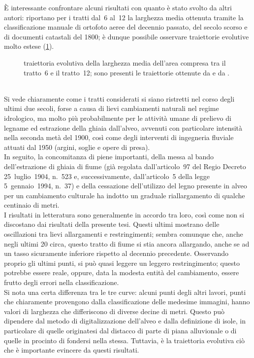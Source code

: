 È interessante confrontare alcuni risultati con quanto è stato svolto da altri autori:  riportano per i tratti dal~6 al~12 la larghezza media ottenuta tramite la classificazione manuale di ortofoto aeree del decennio passato, del secolo scorso e di documenti catastali del 1800; è dunque possibile osservare traiettorie evolutive molto estese (\cref{graph:larghezze-vs-letteratura}).
%
\begin{figure}
	\centering
	
	\caption[traiettoria evolutiva della larghezza media dell'area compresa tra il tratto~6 e il tratto~12]{traiettoria evolutiva della larghezza media dell'area compresa tra il tratto~6 e il tratto~12; sono presenti le traiettorie ottenute da  e da .}
	\label{graph:larghezze-vs-letteratura}
\end{figure}
%
\\
Si vede chiaramente come i tratti considerati si siano ristretti nel corso degli ultimi due secoli, forse a causa di lievi cambiamenti naturali nel regime idrologico, ma molto più probabilmente per le attività umane di prelievo di legname ed estrazione della ghiaia dall'alveo, avvenuti con particolare intensità nella seconda metà del 1900, così come degli interventi di ingegneria fluviale attuati dal 1950 (argini, soglie e opere di presa).
\\
In seguito, la concomitanza di piene importanti, della messa al bando dell'estrazione di ghiaia di fiume (già regolata dall'articolo~97 del Regio Decreto 25~luglio~1904, n.~523 e, successivamente, dall'articolo~5 della legge 5~gennaio~1994, n.~37) e della cessazione dell'utilizzo del legno presente in alveo per un cambiamento culturale ha indotto un graduale riallargamento di qualche centinaio di metri.
\\
I risultati in letteratura sono generalmente in accordo tra loro, così come non si discostano dai risultati della presente tesi.
Questi ultimi mostrano delle oscillazioni tra lievi allargamenti e restringimenti; sembra comunque che, anche negli ultimi \SI{20}{\anni} circa, questo tratto di fiume si stia ancora allargando, anche se ad un tasso sicuramente inferiore rispetto al decennio precedente.
Osservando proprio gli ultimi punti, si può quasi leggere un leggero restringimento; questo potrebbe essere reale, oppure, data la modesta entità del cambiamento, essere frutto degli errori nella classificazione.
\\
Si nota una certa differenza tra le tre curve: alcuni punti degli altri lavori, punti che chiaramente provengono dalla classificazione delle medesime immagini, hanno valori di larghezza che differiscono di diverse decine di metri.
Questo può dipendere dal metodo di digitalizzazione dell'alveo e dalla definizione di isole, in particolare di quelle originatesi dal distacco di parte di piana alluvionale o di quelle in procinto di fondersi nella stessa.
Tuttavia, è la traiettoria evolutiva ciò che è importante evincere da questi risultati.
